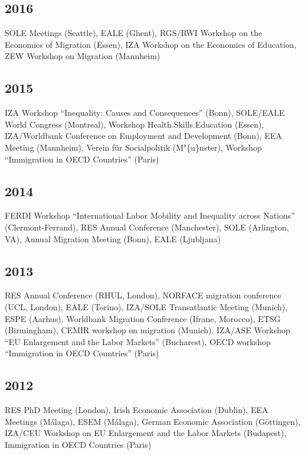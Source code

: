 \documentclass[10pt,a4paper,]{article}
\begin{document}
\hypertarget{section-19}{%
\subsection{2016}\label{section-19}}

SOLE Meetings (Seattle), EALE (Ghent), RGS/RWI Workshop on the Economics
of Migration (Essen), IZA Workshop on the Economics of Education, ZEW
Workshop on Migration (Mannheim)

\hypertarget{section-20}{%
\subsection{2015}\label{section-20}}

IZA Workshop ``Inequality: Causes and Consequences'' (Bonn), SOLE/EALE
World Congress (Montreal), Workshop Health.Skills.Education (Essen),
IZA/Worldbank Conference on Employment and Development (Bonn), EEA
Meeting (Mannheim), Verein für Socialpolitik (M"\{u\}nster), Workshop
``Immigration in OECD Countries'' (Paris)

\hypertarget{section-21}{%
\subsection{2014}\label{section-21}}

FERDI Workshop ``International Labor Mobility and Inequality across
Nations'' (Clermont-Ferrand), RES Annual Conference (Manchester), SOLE
(Arlington, VA), Annual Migration Meeting (Bonn), EALE (Ljubljana)

\hypertarget{section-22}{%
\subsection{2013}\label{section-22}}

RES Annual Conference (RHUL, London), NORFACE migration conference (UCL,
London), EALE (Torino), IZA/SOLE Transatlantic Meeting (Munich), ESPE
(Aarhus), Worldbank Migration Conference (Ifrane, Morocco), ETSG
(Birmingham), CEMIR workshop on migration (Munich), IZA/ASE Workshop
``EU Enlargement and the Labor Markets'' (Bucharest), OECD workshop
``Immigration in OECD Countries'' (Paris)

\hypertarget{section-23}{%
\subsection{2012}\label{section-23}}

RES PhD Meeting (London), Irish Economic Association (Dublin), EEA
Meetings (Málaga), ESEM (Málaga), German Economic Association
(Göttingen), IZA/CEU Workshop on EU Enlargement and the Labor Markets
(Budapest), Immigration in OECD Countries (Paris)
\end{document}
